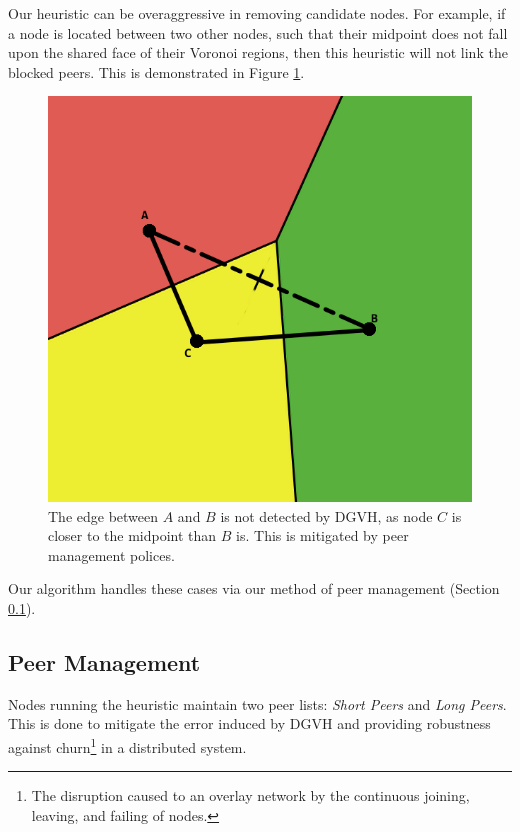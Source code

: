 \documentclass[11pt, conference, letterpaper]{IEEEtran}
\begin{document}
Our heuristic can be overaggressive in removing candidate nodes.
For example, if a node is located between two other nodes, such that their midpoint does not fall upon the shared face of their Voronoi regions, then this heuristic will not link the blocked peers.
This is demonstrated in Figure \ref{occ-ex}.
\begin{figure}
	\centering
	\includegraphics[width=\linewidth]{occlusion}
	\caption{The edge between $A$ and $B$ is not detected by DGVH, as node $C$ is closer to the midpoint than $B$ is.  This is mitigated by peer management polices.}  %
	\label{occ-ex}
\end{figure}
Our algorithm handles these cases via our method of peer management (Section \ref{sec:manage}).









\subsection{Peer Management}
\label{sec:manage}
Nodes running the heuristic maintain two peer lists: \textit{Short Peers} and \textit{Long Peers}.
This is done to  mitigate the error induced by DGVH and providing robustness against churn\footnote{The disruption caused to an overlay network by the continuous joining, leaving, and failing of nodes.} in a distributed system.
\end{document}
